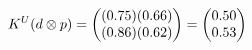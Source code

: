 \documentclass[preview]{standalone}
\begin{document}
\begin{align*}
\special{dvisvgm:raw <g id='unique000'>}K^U(d \otimes p) = \begin{pmatrix} (0.75)(0.66) \\ (0.86)(0.62) \end{pmatrix} = \begin{pmatrix} 0.50 \\ 0.53 \end{pmatrix}\special{dvisvgm:raw </g>}
\end{align*}
\end{document}
